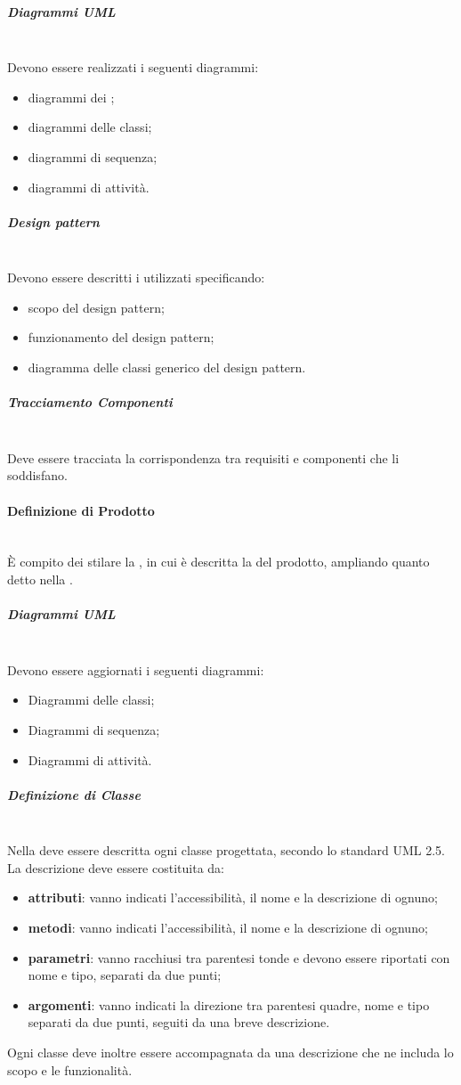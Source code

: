 \subparagraph{Diagrammi UML}\mbox{}\\
Devono essere realizzati i seguenti diagrammi:
\begin{itemize}
	\item diagrammi dei ;
	\item diagrammi delle classi;
	\item diagrammi di sequenza;
	\item diagrammi di attività.
\end{itemize}

\subparagraph{Design pattern}\mbox{}\\
Devono essere descritti i  utilizzati specificando:
\begin{itemize}
	\item scopo del design pattern;
	\item funzionamento del design pattern;
	\item diagramma delle classi generico del design pattern.
\end{itemize}

\subparagraph{Tracciamento Componenti}\mbox{}\\
Deve essere tracciata la corrispondenza tra requisiti e componenti che li soddisfano.

\paragraph{Definizione di Prodotto}\mbox{}\\
\`{E} compito dei \Progettisti{} stilare la \DefinizioneDiProdotto, in cui è descritta la \PD{} del prodotto, ampliando quanto detto nella \SpecificaTecnica.

\subparagraph{Diagrammi UML}\mbox{}\\
Devono essere aggiornati i seguenti diagrammi:
\begin{itemize}
	\item Diagrammi delle classi;
	\item Diagrammi di sequenza;
	\item Diagrammi di attività.
\end{itemize}

\subparagraph{Definizione di Classe}\mbox{}\\
Nella \DefinizioneDiProdotto{} deve essere descritta ogni classe progettata, secondo lo standard UML 2.5. La descrizione deve essere costituita da:
\begin{itemize}
	\item \textbf{attributi}: vanno indicati l'accessibilità, il nome e la descrizione di ognuno;
	\item \textbf{metodi}: vanno indicati l'accessibilità, il nome e la descrizione di ognuno;
	\item \textbf{parametri}: vanno racchiusi tra parentesi tonde e devono essere riportati con nome e tipo, separati da due punti;
	\item \textbf{argomenti}: vanno indicati la direzione tra parentesi quadre, nome e tipo separati da due punti, seguiti da una breve descrizione.
\end{itemize}
Ogni classe deve inoltre essere accompagnata da una descrizione che ne includa lo scopo e le funzionalità.


